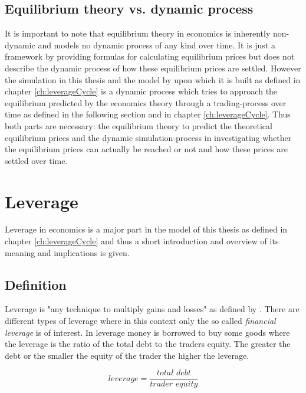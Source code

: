 \documentclass[../Bachelorarbeit.tex]{subfiles}
\begin{document}
\subsection{Equilibrium theory vs. dynamic process}
It is important to note that equilibrium theory in economics is inherently non-dynamic and models no dynamic process of any kind over time. It is just a framework by providing formulas for calculating equilibrium prices but does not describe the dynamic process of how these equilibrium prices are settled. However the simulation in this thesis and the model by \cite{Breuer2015} upon which it is built as defined in chapter \ref{ch:leverageCycle} is a dynamic process which tries to approach the equilibrium predicted by the economics theory through a trading-process over time as defined in the following section and in chapter \ref{ch:leverageCycle}.  Thus both parts are necessary: the equilibrium theory to predict the theoretical equilibrium prices and the dynamic simulation-process in investigating whether the equilibrium prices can actually be reached or not and how these prices are settled over time.



\section{Leverage}
Leverage in economics is a major part in the model of this thesis as defined in chapter \ref{ch:leverageCycle} and thus a short introduction and overview of its meaning and implications is given.

\subsection{Definition}

Leverage is "any technique to multiply gains and losses" as defined by \cite{Brigham2012}. There are different types of leverage where in this context only the so called \textit{financial leverage} is of interest. In leverage money is borrowed to buy some goods where the leverage is the ratio of the total debt to the traders equity. The greater the debt or the smaller the equity of the trader the higher the leverage.

\begin{equation}
leverage = \frac{\textit{total debt}}{\textit{trader equity}}
\end{equation}

\medskip
\end{document}
